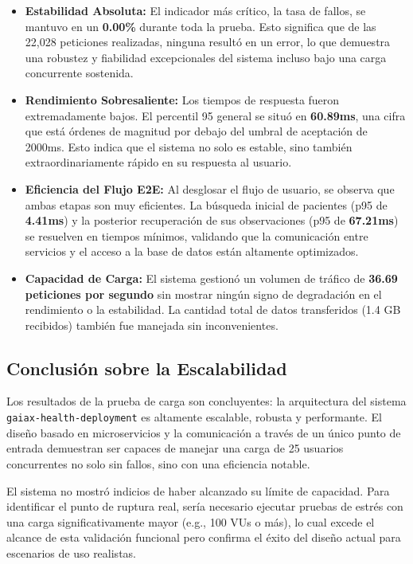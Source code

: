 \begin{itemize}
    \item \textbf{Estabilidad Absoluta:} El indicador más crítico, la tasa de fallos, se mantuvo en un \textbf{0.00\%} durante toda la prueba. Esto significa que de las 22,028 peticiones realizadas, ninguna resultó en un error, lo que demuestra una robustez y fiabilidad excepcionales del sistema incluso bajo una carga concurrente sostenida.

    \item \textbf{Rendimiento Sobresaliente:} Los tiempos de respuesta fueron extremadamente bajos. El percentil 95 general se situó en \textbf{60.89ms}, una cifra que está órdenes de magnitud por debajo del umbral de aceptación de 2000ms. Esto indica que el sistema no solo es estable, sino también extraordinariamente rápido en su respuesta al usuario.

    \item \textbf{Eficiencia del Flujo E2E:} Al desglosar el flujo de usuario, se observa que ambas etapas son muy eficientes. La búsqueda inicial de pacientes (p95 de \textbf{4.41ms}) y la posterior recuperación de sus observaciones (p95 de \textbf{67.21ms}) se resuelven en tiempos mínimos, validando que la comunicación entre servicios y el acceso a la base de datos están altamente optimizados.

    \item \textbf{Capacidad de Carga:} El sistema gestionó un volumen de tráfico de \textbf{36.69 peticiones por segundo} sin mostrar ningún signo de degradación en el rendimiento o la estabilidad. La cantidad total de datos transferidos (1.4 GB recibidos) también fue manejada sin inconvenientes.
\end{itemize}

\subsection{Conclusión sobre la Escalabilidad}
Los resultados de la prueba de carga son concluyentes: la arquitectura del sistema \texttt{gaiax-health-deployment} es altamente escalable, robusta y performante. El diseño basado en microservicios y la comunicación a través de un único punto de entrada demuestran ser capaces de manejar una carga de 25 usuarios concurrentes no solo sin fallos, sino con una eficiencia notable.

El sistema no mostró indicios de haber alcanzado su límite de capacidad. Para identificar el punto de ruptura real, sería necesario ejecutar pruebas de estrés con una carga significativamente mayor (e.g., 100 VUs o más), lo cual excede el alcance de esta validación funcional pero confirma el éxito del diseño actual para escenarios de uso realistas.
